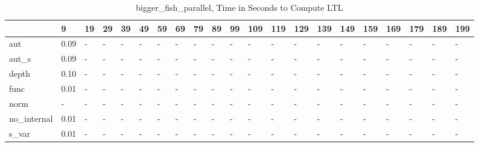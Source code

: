 \begin{table}
\caption{bigger_fish_parallel, Time in Seconds to Compute LTL}
\label{bigger_fish_parallel_LTL_time}
\begin{tabular}{lllllllllllllllllllll}
\toprule
 & 9 & 19 & 29 & 39 & 49 & 59 & 69 & 79 & 89 & 99 & 109 & 119 & 129 & 139 & 149 & 159 & 169 & 179 & 189 & 199 \\
\midrule
aut & 0.09 & - & - & - & - & - & - & - & - & - & - & - & - & - & - & - & - & - & - & - \\
aut_s & 0.09 & - & - & - & - & - & - & - & - & - & - & - & - & - & - & - & - & - & - & - \\
depth & 0.10 & - & - & - & - & - & - & - & - & - & - & - & - & - & - & - & - & - & - & - \\
func & 0.01 & - & - & - & - & - & - & - & - & - & - & - & - & - & - & - & - & - & - & - \\
norm & - & - & - & - & - & - & - & - & - & - & - & - & - & - & - & - & - & - & - & - \\
no_internal & 0.01 & - & - & - & - & - & - & - & - & - & - & - & - & - & - & - & - & - & - & - \\
s_var & 0.01 & - & - & - & - & - & - & - & - & - & - & - & - & - & - & - & - & - & - & - \\
\bottomrule
\end{tabular}
\end{table}
